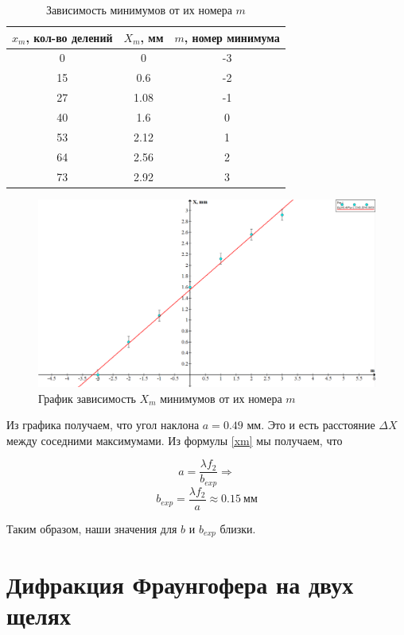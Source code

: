 \begin{table}[h!]
	\caption{Зависимость минимумов от их номера $ m $}
	\begin{center}
		\begin{tabular}{|c|c|c|}
			\hline
			$ x_m $, кол-во делений & $ X_m $, мм & $ m $, номер минимума \\
			\hline
			0 & 0   &    -3 \\
			\hline
			15 & 0.6 &   -2 \\
            \hline
			27 & 1.08 &  -1\\
			\hline
			40 & 1.6 &    0 \\
			\hline
			53 & 2.12 &    1 \\
			\hline
			64 & 2.56 &   2\\
			\hline
			73 & 2.92 &   3 \\
			\hline
		\end{tabular}
	\end{center}
	\label{}
\end{table}

	\begin{figure}[h!]
	\label{graf_b}
	\includegraphics[scale=0.47]{pics/graph2.png}
	\caption{График зависимость $ X_m $ минимумов от их номера $ m $}
\end{figure}


Из графика получаем, что угол наклона $ a = 0.49 $ мм. Это и есть расстояние $ \Delta X $ между соседними максимумами. Из формулы \eqref{xm} мы получаем, что 

\[ a = \frac{\lambda f_2}{b_{exp}} \Rightarrow   \]
\[ b_{exp} = \frac{\lambda f_2}{a} \approx  0.15 \: \text{мм}    \]

Таким образом, наши значения для $ b $ и $ b_{exp} $ близки. 

\newpage

\section{Дифракция Фраунгофера на двух щелях}

